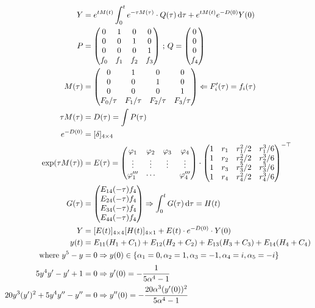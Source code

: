 \documentclass[12pt]{article}
\begin{document}
\begin{align}
Y &= e^{tM(t)} \int_0^t e^{-\tau M(\tau)}\cdot Q(\tau)\,\mathrm{d}\tau + e^{tM(t)} e^{-D(0)} Y(0) \\
P &= \begin{pmatrix} 0 & 1 & 0 & 0 \\ 0 & 0 & 1 & 0 \\ 0 & 0 & 0 & 1 \\ f_0 & f_1 & f_2 & f_3 \end{pmatrix}\,;\,Q = \begin{pmatrix} 0 \\ 0 \\ 0 \\ f_4 \end{pmatrix} \\
M(\tau) &= \begin{pmatrix} 0 & 1 & 0 & 0 \\ 0 & 0 & 1 & 0 \\ 0 & 0 & 0 & 1 \\ F_0/\tau & F_1/\tau & F_2/\tau & F_3/\tau \end{pmatrix} \Leftarrow F_i'(\tau) = f_i(\tau) \\
\tau M(\tau) &= D(\tau) = \int P(\tau) \\
e^{-D(0)} &= [\delta]_{4 \times 4} \\
\exp (\tau M(\tau)) &= E(\tau) = \begin{pmatrix} \varphi_1 & \varphi_2 & \varphi_3 & \varphi_4 \\ \vdots & \vdots & \vdots & \vdots \\ \varphi_1''' & \cdots &  & \varphi_4''' \end{pmatrix} \cdot \begin{pmatrix} 1 & r_1 & r_1^2/2 & r_1^3/6 \\ 1 & r_2 & r_2^2/2 & r_2^3/6 \\ 1 & r_3 & r_3^2/2 & r_3^3/6 \\ 1 & r_4 & r_4^2/2 & r_4^3/6 \end{pmatrix}^{-\top} \\
G(\tau) &= \begin{pmatrix} E_{14}(-\tau) f_4 \\ E_{24}(-\tau) f_4 \\ E_{34}(-\tau) f_4 \\ E_{44}(-\tau) f_4 \end{pmatrix} \Rightarrow \int_0^t G(\tau)\,\mathrm{d}\tau = H(t) \\
Y &= [E(t)]_{4 \times 4} [H(t)]_{4 \times 1} + E(t)\cdot e^{-D(0)}\cdot Y(0) \\
y(t) &= E_{11} (H_1 + C_1) + E_{12} (H_2 + C_2) + E_{13} (H_3 + C_3) + E_{14} (H_4 + C_4) \\
\text{where }y^5 - y &= 0 \Rightarrow y(0) \in \{\alpha_1 = 0, \alpha_2 = 1, \alpha_3 = -1, \alpha_4 = i, \alpha_5 = -i \} \\
5y^4 y' - y' + 1 &= 0 \Rightarrow y'(0) = -\cfrac{1}{5\alpha^4 - 1} \nonumber \\
20y^3 (y')^2 + 5y^4 y'' - y'' &= 0 \Rightarrow y''(0) = -\cfrac{20\alpha^3 (y'(0))^2}{5\alpha^4 - 1} \nonumber 
\end{align}
\end{document}
